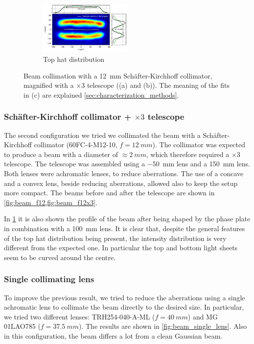 \begin{figure}[p]
\begin{subfigure}{0.5\textwidth}
    \end{subfigure}
    \\
    \hfill
    \begin{subfigure}{\textwidth}
        \centering
        \includegraphics[width=0.5\textwidth]{chapters/chapter_3/figures/tophat_f12x3.pdf}
        \caption{Top hat distribution}
        \label{fig:tophat_f12x3}
    \end{subfigure}
    \hfill
    \caption{Beam collimation with a \SI{12}{mm} Schäfter-Kirchhoff collimator, magnified with a $\times3$ telescope ((a) and (b)).  The meaning of the fits in (c) are explained \cref{sec:characterization_methods}.}
    \label{fig:f12mm}
\end{figure}

\subsubsection{Schäfter-Kirchhoff collimator + $\times 3$ telescope}
The second configuration we tried we collimated the beam with a Schäfter-Kirchhoff collimator (60FC-4-M12-10, $f=\SI{12}{mm}$). The collimator was expected to produce a beam with a diameter of $\approx \SI{2}{mm}$, which therefore required a $\times3$ telescope. The telescope was assembled using a \SI{-50}{mm} lens and a \SI{150}{mm} lens. Both lenses were achromatic lenses, to reduce aberrations. The use of a concave and a convex lens, beside reducing aberrations, allowed also to keep the setup more compact. The beams before and after the telescope are shown in \cref{fig:beam_f12,fig:beam_f12x3}.

In \cref{fig:tophat_f12x3} it is also shown the profile of the beam after being shaped by the phase plate in combination with a \SI{100}{mm} lens. It is clear that, despite the general features of the top hat distribution being present, the intensity distribution is very different from the expected one. In particular the top and bottom light sheets seem to be curved around the centre.

\subsubsection{Single collimating lens}
To improve the previous result, we tried to reduce the aberrations using a single achromatic lens to collimate the beam directly to the desired size. In particular, we tried two different lenses: TRH254-040-A-ML ($f=\SI{40}{mm}$) and MG 01LAO785 ($f=\SI{37.5}{mm}$). The results are shown in \cref{fig:beam_single_lens}. Also in this configuration, the beam differs a lot from a clean Gaussian beam.

